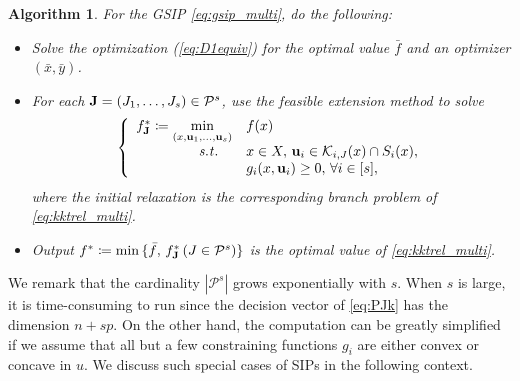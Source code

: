\documentclass{amsart}
\newcommand{\reff}[1]{(\ref{#1})}
\theoremstyle{plain}
\newtheorem{algorithm}[theorem]{Algorithm}
\newcommand{\st}{\mathit{s.t.}}
\newcommand{\mc}[1]{\mathcal{#1}}
\numberwithin{equation}{section}
\begin{document}
		\begin{algorithm}\label{alg:2}
			For the GSIP \eqref{eq:gsip_multi}, do the following:
			\begin{itemize}
				
				\item[{\bf Step~1}]
				Solve the optimization \reff{eq:D1equiv} for the optimal value 
				$\bar{f}$ and an optimizer $(\bar{x}, \bar{y})$.
				
				\item [{\bf Step~2}] 
				For each ${\bf J} = (J_1,\ldots, J_s)\in\mc{P}^s$, use the feasible 
				extension method to solve
					\begin{equation}\label{eq:P_bfJk}
					\left\{\begin{array}{rl}
							f_{\bf J}^*\coloneqq \min\limits_{(x,{\bf u}_1,\ldots, {\bf u}_s)} & f(x)\\
						\st\quad & x\in X,\, {\bf u}_i\in\mc{K}_{i,J}(x)\cap S_i(x),\\
						& g_i(x,{\bf u}_i)\ge 0,\,\forall i\in[s],\\
					\end{array}
					\right.
					\end{equation}
					where the initial relaxation is the corresponding branch problem of \eqref{eq:kktrel_multi}.
				
				\item [{\bf Step~3}]
				Output $f^*\coloneqq \min\, \{\bar{f},\, f_{\bf J}^*\,(J\in \mc{P}^s)\}$
				is the optimal value of \eqref{eq:kktrel_multi}.
			\end{itemize}
		\end{algorithm}
		We remark that the cardinality $|\mc{P}^s|$ grows exponentially with $s$. 
		When $s$ is large, it is time-consuming to run  since the 
		decision vector of \eqref{eq:PJk} has the dimension $n+sp$.
		On the other hand, the computation can be greatly simplified if we assume that
		all but a few constraining functions $g_i$ are either convex or concave in $u$. 
		We discuss such special cases of SIPs in the following context.
		
		
\end{document}

